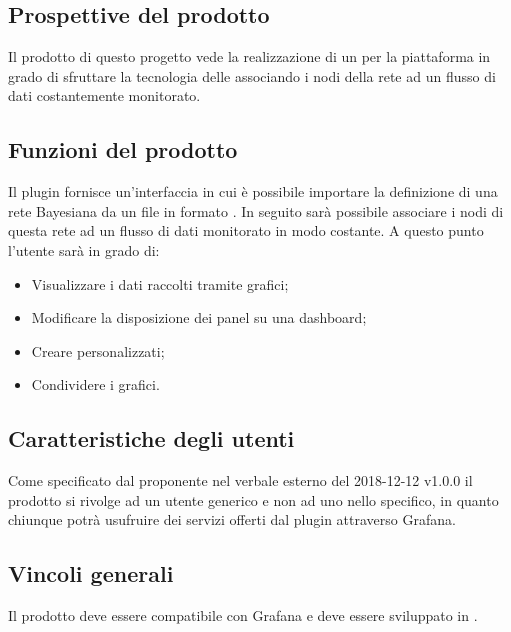 
\subsection{Prospettive del prodotto}
Il prodotto di questo progetto vede la realizzazione di un  per la piattaforma  in grado di sfruttare la tecnologia delle  associando i nodi della rete ad un flusso di dati costantemente monitorato.

\subsection{Funzioni del prodotto}
Il plugin fornisce un'interfaccia in cui è possibile importare la definizione di una rete Bayesiana da un file in formato . In seguito sarà possibile associare i nodi di questa rete ad un flusso di dati monitorato in modo costante. A questo punto l'utente sarà in grado di:
\begin{itemize}
	\item Visualizzare i dati raccolti tramite grafici;
	\item Modificare la disposizione dei panel su una dashboard;
	\item Creare  personalizzati;
	\item Condividere i grafici.
\end{itemize}

\subsection{Caratteristiche degli utenti}
Come specificato dal proponente nel verbale esterno del 2018-12-12 v1.0.0 il prodotto si rivolge ad un utente generico e non ad uno nello specifico, in quanto chiunque potrà usufruire dei servizi offerti dal plugin attraverso Grafana. 

\subsection{Vincoli generali}
Il prodotto deve essere compatibile con Grafana e deve essere sviluppato in .

\pagebreak